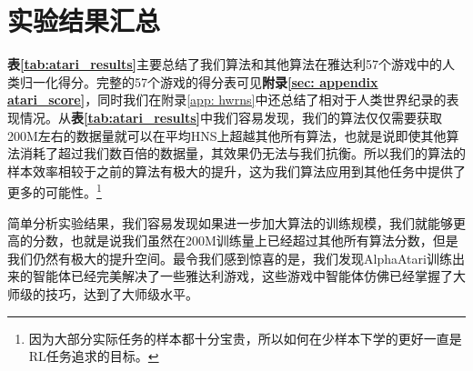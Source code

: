 \section{实验结果汇总}

\textbf{表\ref{tab:atari_results}}主要总结了我们算法和其他算法在雅达利57个游戏中的人类归一化得分。完整的57个游戏的得分表可见\textbf{附录\ref{sec: appendix atari_score}}，同时我们在附录\ref{app: hwrns}中还总结了相对于人类世界纪录的表现情况。从\textbf{表\ref{tab:atari_results}}中我们容易发现，我们的算法仅仅需要获取200M左右的数据量就可以在平均HNS上超越其他所有算法，也就是说即使其他算法消耗了超过我们数百倍的数据量，其效果仍无法与我们抗衡。所以我们的算法的样本效率相较于之前的算法有极大的提升，这为我们算法应用到其他任务中提供了更多的可能性。\footnote{因为大部分实际任务的样本都十分宝贵，所以如何在少样本下学的更好一直是RL任务追求的目标。}

简单分析实验结果，我们容易发现如果进一步加大算法的训练规模，我们就能够更高的分数，也就是说我们虽然在200M训练量上已经超过其他所有算法分数，但是我们仍然有极大的提升空间。最令我们感到惊喜的是，我们发现AlphaAtari训练出来的智能体已经完美解决了一些雅达利游戏，这些游戏中智能体仿佛已经掌握了大师级的技巧，达到了大师级水平。

